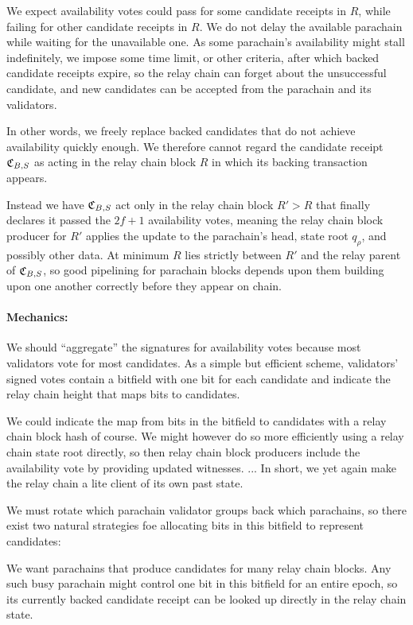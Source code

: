 We expect availability votes could pass for some candidate receipts in $R$, while failing for other candidate receipts in $R$.  We do not delay the available parachain while waiting for the unavailable one.  As some parachain's availability might stall indefinitely, we impose some time limit, or other criteria, after which backed candidate receipts expire, so the relay chain can forget about the unsuccessful candidate, and new candidates can be accepted from the parachain and its validators.  

In other words, we freely replace backed candidates that do not achieve availability quickly enough.  We therefore cannot regard the candidate receipt $\mathfrak{C}_{B,S}$ as acting in the relay chain block $R$ in which its backing transaction appears.  

Instead we have $\mathfrak{C}_{B,S}$ act only in the relay chain block $R' > R$ that finally declares it passed the $2f+1$ availability votes, meaning the relay chain block producer for $R'$ applies the update to the parachain's head, state root $q_\rho$, and possibly other data.  At minimum $R$ lies strictly between $R'$ and the relay parent of $\mathfrak{C}_{B,S}$, so good pipelining for parachain blocks depends upon them building upon one another correctly before they appear on chain.

\smallskip
\paragraph{Mechanics:}

We should ``aggregate'' the signatures for availability votes because most validators vote for most candidates.
%
As a simple but efficient scheme, validators' signed votes contain a bitfield with one bit for each candidate and indicate the relay chain height that maps bits to candidates.  

We could indicate the map from bits in the bitfield to candidates with a relay chain block hash of course.  We might however do so more efficiently using a relay chain state root directly, so then relay chain block producers include the availability vote by providing updated witnesses.  ...  In short, we yet again make the relay chain a lite client of its own past state.

We must rotate which parachain validator groups back which parachains, so there exist two natural strategies foe allocating bits in this bitfield to represent candidates: 

We want parachains that produce candidates for many relay chain blocks.  Any such busy parachain might control one bit in this bitfield for an entire epoch, so its currently backed candidate receipt can be looked up directly in the relay chain state.  

